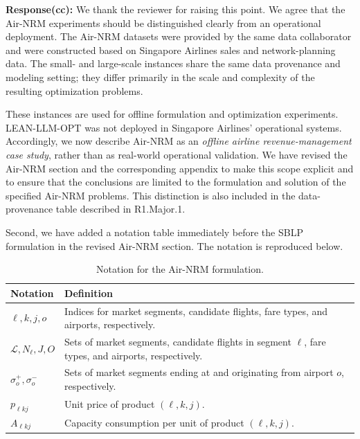 \documentclass[11pt]{article}
\begin{document}
\begin{enumerate}[label=(AssoE.\arabic*),leftmargin=*]
\begin{enumerate}[label=(R1.Major.\arabic*),leftmargin=*]
\noindent\textbf{Response(cc):} 
We thank the reviewer for raising this point. We agree that the Air-NRM
experiments should be distinguished clearly from an operational deployment.
The Air-NRM datasets were provided by the same data collaborator and were
constructed based on Singapore Airlines sales and network-planning data. The
small- and large-scale instances share the same data provenance and modeling
setting; they differ primarily in the scale and complexity of the resulting
optimization problems.

These instances are used for offline formulation and optimization experiments.
LEAN-LLM-OPT was not deployed in Singapore Airlines' operational systems.
Accordingly, we now describe Air-NRM as an \emph{offline airline
revenue-management case study}, rather than as real-world operational
validation. We have revised the Air-NRM section and the corresponding appendix
to make this scope explicit and to ensure that the conclusions are limited to
the formulation and solution of the specified Air-NRM problems. This
distinction is also included in the data-provenance table described in
R1.Major.1.

Second, we have added a notation table immediately before the SBLP formulation in the revised Air-NRM section. The notation is reproduced below.

\begin{table}[!htbp]
\centering
\caption{Notation for the Air-NRM formulation.}
\label{tab:air-nrm-notation-response}
\begin{tabular}{p{} p{}}
\toprule
\textbf{Notation} & \textbf{Definition} \\
\midrule
$\ell, k, j, o$
& Indices for market segments, candidate flights, fare types, and airports, respectively. \\

$\mathcal{L}, N_\ell, J, O$
& Sets of market segments, candidate flights in segment $\ell$, fare types, and airports, respectively. \\

$\sigma_o^+, \sigma_o^-$
& Sets of market segments ending at and originating from airport $o$, respectively. \\

$p_{\ell kj}$
& Unit price of product $(\ell,k,j)$. \\

$A_{\ell kj}$
& Capacity consumption per unit of product $(\ell,k,j)$. \\


\end{tabular}
\end{table}
\end{enumerate}
\end{enumerate}
\end{document}
